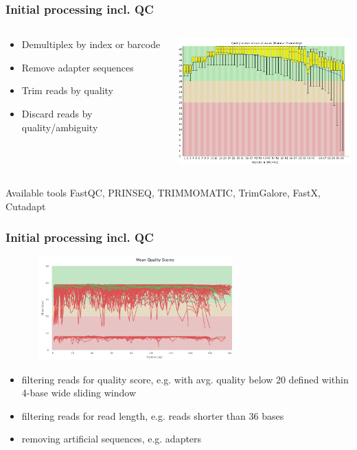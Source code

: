 \documentclass{beamer}\usepackage[]{graphicx}\usepackage[]{color}
\begin{document}
\begin{frame}
\frametitle{Initial processing incl. QC}
\footnotesize
\begin{columns}
\begin{column}{0.38\textwidth}
\begin{itemize}
\item Demultiplex by index or barcode
\item Remove adapter sequences
\item Trim reads by quality
\item Discard reads by quality/ambiguity
\end{itemize}
\end{column}
\begin{column}{0.58\textwidth}
\includegraphics[width=7cm]{Images/fastq_qc_good.png}
\end{column}
\end{columns}
\vspace{5mm}
\begin{block}{Available tools}
FastQC, PRINSEQ, TRIMMOMATIC, TrimGalore, FastX, Cutadapt
\end{block}
\end{frame}

\begin{frame}
\frametitle{Initial processing incl. QC}
\centering
\includegraphics[width=10cm, height=4cm]{Images/fastq_qc_poor.png}
\begin{itemize}
\footnotesize
\item filtering reads for quality score, e.g. with avg. quality below 20 defined within 4-base wide sliding window
\item filtering reads for read length, e.g. reads shorter than 36 bases
\item removing artificial sequences, e.g. adapters
\end{itemize}
\end{frame}
\end{document}
